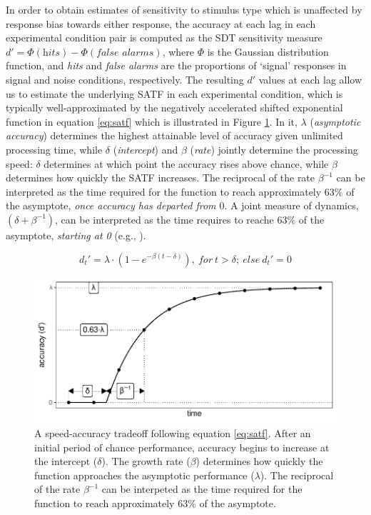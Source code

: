 \documentclass[10pt,letterpaper]{article}
\begin{document}
In order to obtain estimates of sensitivity to stimulus type which is unaffected by response bias towards either response, the accuracy at each lag in each experimental condition pair is computed as the SDT sensitivity measure $d' = \Phi(\textit{hits}) - \Phi(\textit{false alarms})$, where $\Phi$ is the Gaussian distribution function, and \textit{hits} and \textit{false alarms} are the proportions of `signal' responses in signal and noise conditions, respectively. The resulting $d'$ values at each lag allow us to estimate the underlying SATF in each experimental condition, which is typically well-approximated by the negatively accelerated shifted exponential function in equation \ref{eq:satf} \cite{Dosher1979} which is illustrated in Figure \ref{fig:illustrationSATF}. In it, $\lambda$ (\textit{asymptotic accuracy}) determines the highest attainable level of accuracy given unlimited processing time, while $\delta$ (\textit{intercept}) and $\beta$ (\textit{rate}) jointly determine the processing speed: $\delta$ determines at which point the accuracy rises above chance, while $\beta$ determines how quickly the SATF increases. The reciprocal of the rate $\beta^{-1}$ can be interpreted as the time required for the function to reach approximately $63\%$ of the asymptote, \textit{once accuracy has departed from $0$}.
A joint measure of dynamics, $(\delta+\beta^{-1})$, can be interpreted as the time requires to reache $63\%$ of the asymptote, \textit{starting at 0} (e.g., ). 


\vspace{-0.3cm}
\begin{equation}
d_t' = \lambda \cdot \left(1-e^{-\beta(t-\delta)} \right),~for~t > \delta;~else~d_t'=0
\label{eq:satf}
\end{equation}

\begin{figure}[t]
\centering
\includegraphics[width=1\columnwidth]{../figures/illustrations/illustration_satf.pdf} %
\caption{\label{fig:illustrationSATF}A speed-accuracy tradeoff following equation \ref{eq:satf}. After an initial period of chance performance, accuracy begins to increase at the intercept ($\delta$). The growth rate ($\beta$) determines how quickly the function approaches the asymptotic performance ($\lambda$).
The reciprocal of the rate $\beta^{-1}$ can be interpeted as the time required for the function to reach approximately $63\%$ of the asymptote.
}
\end{figure}
\end{document}
